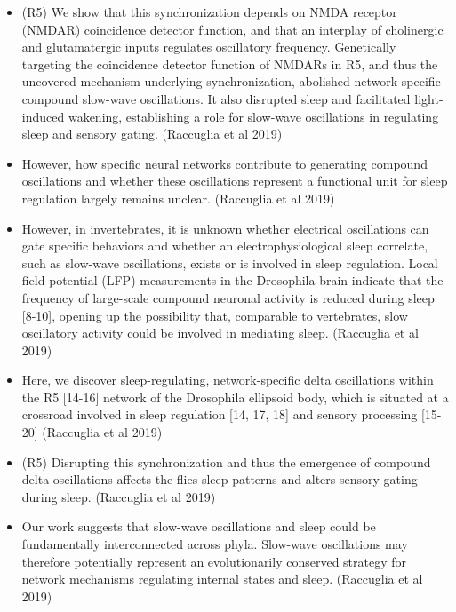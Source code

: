 \documentclass[11pt]{article}
\begin{document}
\begin{itemize}
    \item (R5) We show that this synchronization depends on NMDA receptor (NMDAR) coincidence detector function, and that an interplay of cholinergic and glutamatergic inputs regulates oscillatory frequency.
    Genetically targeting the coincidence detector function of NMDARs in R5, and thus the uncovered mechanism underlying synchronization, abolished network-specific compound slow-wave oscillations. It also disrupted sleep and facilitated light-induced wakening, establishing a role for slow-wave oscillations in regulating sleep and sensory gating.
    \cite{raccugliaNetworkSpecificSynchronizationElectrical2019} (Raccuglia et al 2019)

    \item However, how specific neural networks contribute to generating compound oscillations and whether these oscillations represent a functional unit for sleep regulation largely remains unclear.
    \cite{raccugliaNetworkSpecificSynchronizationElectrical2019} (Raccuglia et al 2019)

    \item However, in invertebrates, it is unknown whether electrical oscillations can gate specific behaviors and whether an electrophysiological sleep correlate, such as slow-wave oscillations, exists or is involved in sleep regulation. Local field potential (LFP) measurements in the Drosophila brain indicate that the frequency of large-scale compound neuronal activity is reduced during sleep [8-10], opening up the possibility that, comparable to vertebrates, slow oscillatory activity could be involved in mediating sleep.
    \cite{raccugliaNetworkSpecificSynchronizationElectrical2019} (Raccuglia et al 2019)

    \item Here, we discover sleep-regulating, network-specific delta oscillations within the R5 [14-16] network of the Drosophila ellipsoid body, which is situated at a crossroad involved in sleep
    regulation [14, 17, 18] and sensory processing [15-20]
    \cite{raccugliaNetworkSpecificSynchronizationElectrical2019} (Raccuglia et al 2019)

    \item (R5) Disrupting this synchronization and thus the emergence of compound delta oscillations affects the flies sleep patterns and alters sensory gating during sleep.
    \cite{raccugliaNetworkSpecificSynchronizationElectrical2019} (Raccuglia et al 2019)

    \item Our work suggests that slow-wave oscillations and sleep could be fundamentally interconnected across phyla. Slow-wave oscillations may therefore potentially represent an evolutionarily conserved strategy for network mechanisms regulating internal states and sleep.
    \cite{raccugliaNetworkSpecificSynchronizationElectrical2019} (Raccuglia et al 2019)


\end{itemize}
\end{document}
